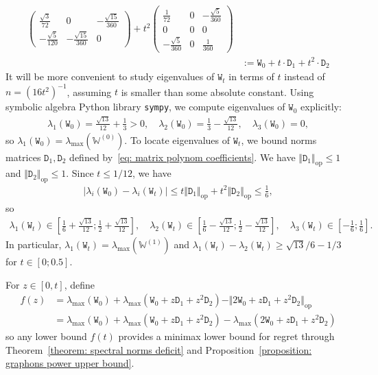 \documentclass[11pt]{article}
\newcommand{\op}{\mathrm{op}}
\newcommand{\bbW}{\mathbb{W}}
\newcommand{\<}{\langle}
\renewcommand{\>}{\rangle}
\newcommand{\ttW}{\mathtt{W}}
\newcommand{\ttD}{\mathtt{D}}
\theoremstyle{plain}
\theoremstyle{definition}
\theoremstyle{remark}
\begin{document}
{\begin{align}
\begin{pmatrix}
        \frac{\sqrt{3}}{72} & 0 & - \frac{\sqrt{15}}{360} \\
        - \frac{\sqrt{5}}{120} & - \frac{\sqrt{15}}{360} & 0 
       \end{pmatrix} + t^2 \begin{pmatrix}
        \frac{1}{72} & 0 & - \frac{\sqrt{5}}{360} \\
        0 & 0 & 0 \\
        - \frac{\sqrt{5}}{360} & 0 & \frac{1}{360}
       \end{pmatrix} \nonumber \\
       & := \ttW_0 + t \cdot \ttD_1 + t^2 \cdot \ttD_2 \label{eq: matrix polynom coefficients}
   \end{align}
   It will be more convenient to study eigenvalues of $\ttW_t$ in terms of $t$ instead of $n = (16 t^2)^{-1}$, assuming $t$ is smaller than some absolute constant. Using symbolic algebra Python library \texttt{sympy}, we compute eigenvalues of $\ttW_0$ explicitly:
   \begin{align}
    \label{eq: eigenvalues of W0}
        \lambda_{1}(\ttW_0) = \frac{\sqrt{13}}{12} + \frac{1}{3} > 0, \quad \lambda_2(\ttW_0) = \frac{1}{3} - \frac{\sqrt{13}}{12}, \quad \lambda_{3}(\ttW_0) = 0,
   \end{align}
   so $\lambda_{1}(\ttW_0) = \lambda_{\max}(\bbW^{(0)})$.
   To locate eigenvalues of $\ttW_t$, we bound norms matrices $\ttD_1, \ttD_2$ defined by~\eqref{eq: matrix polynom coefficients}. We have $\Vert \ttD_1\Vert_{\op} \le 1$ and $\Vert \ttD_2 \Vert_{\op} \le 1$. Since $t \le 1/12$, we have
   \begin{align*}
    |\lambda_i(\ttW_0) - \lambda_i (\ttW_t)| \le t \Vert \ttD_1 \Vert_{\op} + t^2 \Vert \ttD_2 \Vert_{\op} \le \frac{1}{6},
   \end{align*}
   so
   \begin{align*}
        \lambda_1(\ttW_t) \in \left [\frac{1}{6} + \frac{\sqrt{13}}{12}; \frac{1}{2} + \frac{\sqrt{13}}{12} \right ], \quad \lambda_2(\ttW_t) \in \left [ \frac{1}{6} - \frac{\sqrt{13}}{12} ; \frac{1}{2} - \frac{\sqrt{13}}{12} \right ], \quad \lambda_3(\ttW_t) \in \left [- \frac{1}{6}; \frac{1}{6} \right ].
   \end{align*}
   In particular, $\lambda_1(\ttW_t) = \lambda_{\max}(\bbW^{(1)})$ and $\lambda_1(\ttW_t) - \lambda_2(\ttW_t) \ge \sqrt{13}/6 - 1/3$ for $t \in [0; 0.5]$.

   For $z \in [0, t]$, define
   \begin{align*}
        f(z) & = \lambda_{\max}(\ttW_0) + \lambda_{\max}(\ttW_0 + z \ttD_1 + z^2 \ttD_2) - \Vert 2 \ttW_0 + z \ttD_1 + z^2 \ttD_2 \Vert_{\op} \\
        & = \lambda_{\max}(\ttW_0) + \lambda_{\max}(\ttW_0 + z \ttD_1 + z^2 \ttD_2) - \lambda_{\max}(2\ttW_0 + z \ttD_1 + z^2 \ttD_2)
   \end{align*}
   so any lower bound $f(t)$ provides a minimax lower bound for regret through Theorem~\ref{theorem: spectral norms deficit} and Proposition~\ref{proposition: graphons power upper bound}.

}
\end{document}
